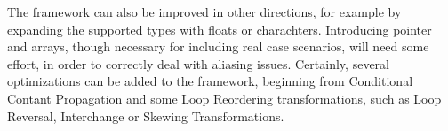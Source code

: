 The framework can also be improved in other directions, for example by expanding the supported types with floats or charachters. Introducing pointer and arrays, though necessary for including real case scenarios, will need some effort, in order to correctly deal with aliasing issues. Certainly, several optimizations can be added to the framework, beginning from Conditional Contant Propagation and some Loop Reordering transformations, such as Loop Reversal, Interchange or Skewing Transformations.
